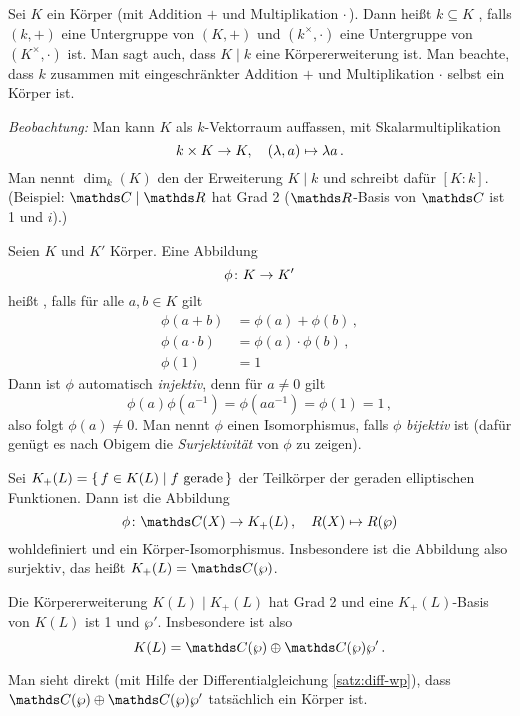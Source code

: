 \begin{erin*}
Sei $K$ ein Körper (mit Addition $+$ und Multiplikation $\cdot$\,).
Dann heißt $k\subseteq K$ , falls $(k,+)$ eine Untergruppe von $(K,+)$ und $(k^\times,\cdot)$ eine Untergruppe von $(K^\times, \cdot)$ ist.
Man sagt auch, dass $K\mid k$ eine Körpererweiterung ist.
Man beachte, dass $k$ zusammen mit eingeschränkter Addition $+$ und Multiplikation $\cdot$ selbst ein Körper ist.

\emph{Beobachtung:}
Man kann $K$ als $k$-Vektorraum auffassen, mit Skalarmultiplikation
\[
	k\times K\rightarrow K,
	\quad (\lambda,a)\mapsto \lambda a
	\,.
\]
Man nennt $\dim_k(K)$ den  der Erweiterung $K\mid k$ und schreibt dafür $[K:k]$.
(Beispiel: $\CC\mid\RR$ hat Grad 2 ($\RR$-Basis von $\CC$ ist 1 und $i$).)

Seien $K$ und $K'$ Körper.
Eine Abbildung
\[
	\phi\colon K\rightarrow K'
\]
heißt , falls für alle $a, b \in K$ gilt
\begin{align*}
	\phi(a+b) &= \phi(a)+\phi(b)\,, \\
	\phi(a\cdot b) &= \phi(a)\cdot\phi(b)\,, \\
	\phi(1)&=1
\end{align*}
Dann ist $\phi$ automatisch \emph{injektiv}, denn für $a \neq 0$ gilt
\[
	\phi(a)\phi(a^{-1})
	= \phi(a a^{-1})
	= \phi(1)= 1
	\,,
\]
also folgt $\phi(a)\neq 0$.
Man nennt $\phi$ einen Isomorphismus, falls $\phi$ \emph{bijektiv} ist (dafür genügt es nach Obigem die \emph{Surjektivität} von $\phi$ zu zeigen).
\end{erin*}

\begin{satz-list}[Struktursatz]
\item Sei $K_+(L) = \left\{\,f\in K(L) \mid f \text{ gerade}\,\right\}$ der Teilkörper der geraden elliptischen Funktionen.
Dann ist die Abbildung
\[
	\phi\colon \CC(X) \ra K_+(L)\,,
	\quad R(X) \mapsto R(\wp)	
\]
wohldefiniert und ein Körper-Isomorphismus.
Insbesondere ist die Abbildung also surjektiv, das heißt $K_+(L) = \CC(\wp)$.

\item Die Körpererweiterung $K(L) \mid K_+(L)$ hat Grad 2 und eine $K_+(L)$-Basis von $K(L)$ ist 1 und $\wp'$.
Insbesondere ist also
\[
	K(L)
	= \CC(\wp) \oplus \CC(\wp) \wp'
	\,.
\]
\end{satz-list}

\begin{beme}[Übung]
	Man sieht direkt (mit Hilfe der Differentialgleichung \autoref{satz:diff-wp}), dass $\CC(\wp) \oplus \CC(\wp) \wp'$ tatsächlich ein Körper ist.
\end{beme}

